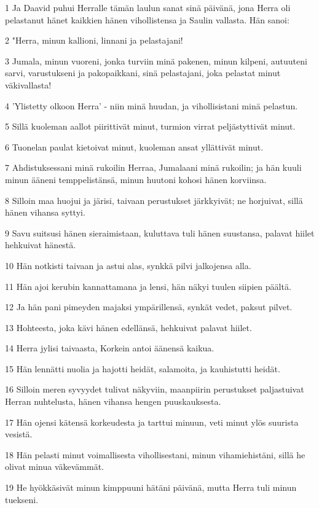 \par 1 Ja Daavid puhui Herralle tämän laulun sanat sinä päivänä, jona Herra oli pelastanut hänet kaikkien hänen vihollistensa ja Saulin vallasta. Hän sanoi:
\par 2 "Herra, minun kallioni, linnani ja pelastajani!
\par 3 Jumala, minun vuoreni, jonka turviin minä pakenen, minun kilpeni, autuuteni sarvi, varustukseni ja pakopaikkani, sinä pelastajani, joka pelastat minut väkivallasta!
\par 4 'Ylistetty olkoon Herra' - niin minä huudan, ja vihollisistani minä pelastun.
\par 5 Sillä kuoleman aallot piirittivät minut, turmion virrat peljästyttivät minut.
\par 6 Tuonelan paulat kietoivat minut, kuoleman ansat yllättivät minut.
\par 7 Ahdistuksessani minä rukoilin Herraa, Jumalaani minä rukoilin; ja hän kuuli minun ääneni temppelistänsä, minun huutoni kohosi hänen korviinsa.
\par 8 Silloin maa huojui ja järisi, taivaan perustukset järkkyivät; ne horjuivat, sillä hänen vihansa syttyi.
\par 9 Savu suitsusi hänen sieraimistaan, kuluttava tuli hänen suustansa, palavat hiilet hehkuivat hänestä.
\par 10 Hän notkisti taivaan ja astui alas, synkkä pilvi jalkojensa alla.
\par 11 Hän ajoi kerubin kannattamana ja lensi, hän näkyi tuulen siipien päältä.
\par 12 Ja hän pani pimeyden majaksi ympärillensä, synkät vedet, paksut pilvet.
\par 13 Hohteesta, joka kävi hänen edellänsä, hehkuivat palavat hiilet.
\par 14 Herra jylisi taivaasta, Korkein antoi äänensä kaikua.
\par 15 Hän lennätti nuolia ja hajotti heidät, salamoita, ja kauhistutti heidät.
\par 16 Silloin meren syvyydet tulivat näkyviin, maanpiirin perustukset paljastuivat Herran nuhtelusta, hänen vihansa hengen puuskauksesta.
\par 17 Hän ojensi kätensä korkeudesta ja tarttui minuun, veti minut ylös suurista vesistä.
\par 18 Hän pelasti minut voimallisesta vihollisestani, minun vihamiehistäni, sillä he olivat minua väkevämmät.
\par 19 He hyökkäsivät minun kimppuuni hätäni päivänä, mutta Herra tuli minun tuekseni.
